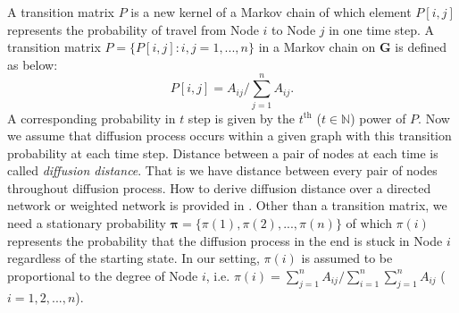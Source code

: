 \documentclass[12pt]{article}
\theoremstyle{definition}
\begin{document}
A transition matrix $P$ is a new kernel of a Markov chain of which element $P[i,j]$ represents the probability of travel from Node $i$ to Node $j$ in one time step. A transition matrix $P = \{P[i,j] : i,j=1,...,n \}$ in a Markov chain on $\mathbf{G}$ is defined as below:
\begin{equation}
P[i,j] = A_{ij} \big/ \sum\limits_{j=1}^{n} A_{ij}.
\end{equation}
 A corresponding probability in $t$ step is given by the $t^{\mbox{th}}$ ($t \in \mathbb{N}$) power of $P$. Now we assume that diffusion process occurs within a given graph with this transition probability at each time step. Distance between a pair of nodes at each time is called \textit{diffusion distance}. That is we have distance between every pair of nodes throughout diffusion process. How to derive diffusion distance over a directed network or weighted network is provided in \cite{tang2010graph}. Other than a transition matrix, we need a stationary probability $\mathbf{\pi} = \{\pi(1), \pi(2), ... , \pi(n) \}$ of which $\pi(i)$ represents the probability that the diffusion process in the end is stuck in Node $i$ regardless of the starting state. In our setting, $\pi(i)$ is assumed to be proportional to the degree of Node $i$, i.e. $\pi(i) = \sum\limits_{j=1}^{n} A_{ij} \big/ \sum\limits_{i=1}^{n}\sum\limits_{j=1}^{n} A_{ij}$ ($i=1,2,..., n$).   
\end{document}
